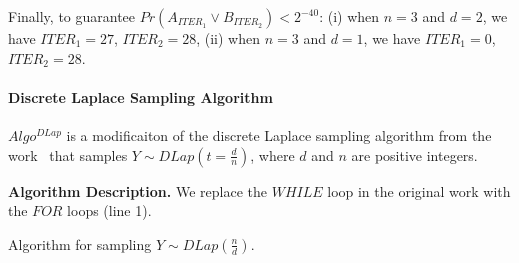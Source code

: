 Finally, to guarantee $Pr\left(A_{ITER_1}\lor B_{ITER_2} \right)<2^{-40}$:
(i) when $n=3$ and $d=2$, we have $ITER_1=27$, $ITER_2=28$,
(ii) when $n=3$ and $d=1$, we have $ITER_1=0$, $ITER_2=28$.


\paragraph{Discrete Laplace Sampling Algorithm}
\label{para:DiscrettLaplaceSamplingAlgorithm}
$Algo^{DLap}$ is a modificaiton of the discrete Laplace sampling algorithm from the work~\cite{canonne2020discrete} that samples $Y\sim DLap\left( t=\frac{d}{n}\right)$, where $d$ and $n$ are positive integers.

\textbf{Algorithm Description.}
We replace the $WHILE$ loop in the original work with the $FOR$ loops (line 1).

\begin{algorithm}[tbh!]
    \centering
    \caption{Algorithm for sampling $Y \sim  DLap\left(\frac{n}{d}\right)$.}
    \label{algo:DiscreteLapCKS}
\end{algorithm}
\FloatBarrier

